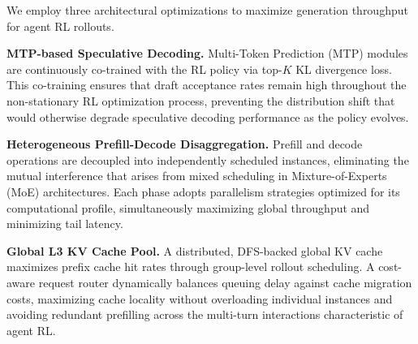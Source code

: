 We employ three architectural optimizations to maximize generation throughput for agent RL rollouts.

\noindent \textbf{MTP-based Speculative Decoding.} Multi-Token Prediction (MTP) modules are continuously co-trained with the RL policy via top-$K$ KL divergence loss. This co-training ensures that draft acceptance rates remain high throughout the non-stationary RL optimization process, preventing the distribution shift that would otherwise degrade speculative decoding performance as the policy evolves.

\noindent \textbf{Heterogeneous Prefill-Decode Disaggregation.} Prefill and decode operations are decoupled into independently scheduled instances, eliminating the mutual interference that arises from mixed scheduling in Mixture-of-Experts (MoE) architectures. Each phase adopts parallelism strategies optimized for its computational profile, simultaneously maximizing global throughput and minimizing tail latency.

\noindent \textbf{Global L3 KV Cache Pool.} A distributed, DFS-backed global KV cache maximizes prefix cache hit rates through group-level rollout scheduling. A cost-aware request router dynamically balances queuing delay against cache migration costs, maximizing cache locality without overloading individual instances and avoiding redundant prefilling across the multi-turn interactions characteristic of agent RL.
